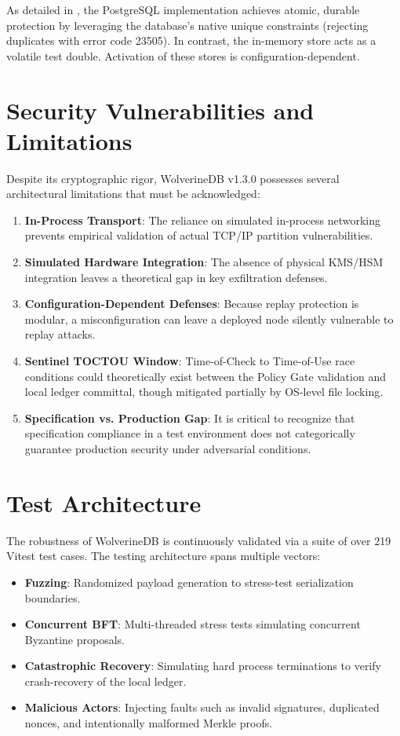 As detailed in , the PostgreSQL implementation achieves atomic, durable protection by leveraging the database's native unique constraints (rejecting duplicates with error code 23505). In contrast, the in-memory store acts as a volatile test double. Activation of these stores is configuration-dependent.

\section{Security Vulnerabilities and Limitations}\label{sec:wdb-vuln}
Despite its cryptographic rigor, WolverineDB v1.3.0 possesses several architectural limitations that must be acknowledged:
\begin{enumerate}
    \item \textbf{In-Process Transport}: The reliance on simulated in-process networking prevents empirical validation of actual TCP/IP partition vulnerabilities.
    \item \textbf{Simulated Hardware Integration}: The absence of physical KMS/HSM integration leaves a theoretical gap in key exfiltration defenses.
    \item \textbf{Configuration-Dependent Defenses}: Because replay protection is modular, a misconfiguration can leave a deployed node silently vulnerable to replay attacks.
    \item \textbf{Sentinel TOCTOU Window}: Time-of-Check to Time-of-Use race conditions could theoretically exist between the Policy Gate validation and local ledger committal, though mitigated partially by OS-level file locking.
    \item \textbf{Specification vs. Production Gap}: It is critical to recognize that specification compliance in a test environment does not categorically guarantee production security under adversarial conditions.
\end{enumerate}

\section{Test Architecture}\label{sec:wdb-test}
The robustness of WolverineDB is continuously validated via a suite of over 219 Vitest test cases. The testing architecture spans multiple vectors:
\begin{itemize}
    \item \textbf{Fuzzing}: Randomized payload generation to stress-test serialization boundaries.
    \item \textbf{Concurrent BFT}: Multi-threaded stress tests simulating concurrent Byzantine proposals.
    \item \textbf{Catastrophic Recovery}: Simulating hard process terminations to verify crash-recovery of the local ledger.
    \item \textbf{Malicious Actors}: Injecting faults such as invalid signatures, duplicated nonces, and intentionally malformed Merkle proofs.
\end{itemize}

